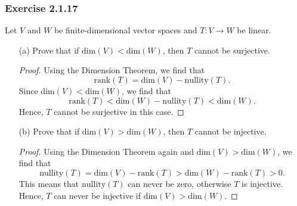 \subsubsection{Exercise 2.1.17} Let \( V  \) and \( W  \) be finite-dimensional vector spaces and \( T: V \to W  \) be linear.
\begin{enumerate}
    \item[(a)] Prove that if \( \text{dim}(V) < \text{dim}(W) \), then \( T  \) cannot be surjective.
        \begin{proof}
        Using the Dimension Theorem, we find that 
        \[  \text{rank}(T) = \text{dim}(V) - \text{nullity}(T). \]
        Since \( \text{dim}(V) < \text{dim}(W) \), we find that 
        \[  \text{rank}(T) < \text{dim}(W) - \text{nullity}(T) < \text{dim}(W). \]
        Hence, \( T  \) cannot be surjective in this case.
        \end{proof}
    \item[(b)] Prove that if \( \text{dim}(V) > \text{dim}(W) \), then \( T \) cannot be injective.
        \begin{proof}
        Using the Dimension Theorem again and \( \text{dim}(V) > \text{dim}(W) \), we find that
        \[  \text{nullity}(T) = \text{dim}(V) - \text{rank}(T) > \text{dim}(W) - \text{rank}(T) > 0. \]
        This means that \( \text{nullity}(T)  \) can never be zero, otherwise \( T  \) is injective. Hence, \( T  \) can never be injective if \( \text{dim}(V) > \text{dim}(W) \).
        \end{proof}
\end{enumerate}

